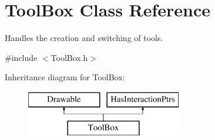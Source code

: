 \hypertarget{class_tool_box}{}\section{Tool\+Box Class Reference}
\label{class_tool_box}


Handles the creation and switching of tools.  




{\ttfamily \#include $<$Tool\+Box.\+h$>$}

Inheritance diagram for Tool\+Box\+:\begin{figure}[H]
\begin{center}
\leavevmode
\includegraphics[height=2.000000cm]{class_tool_box}
\end{center}
\end{figure}
